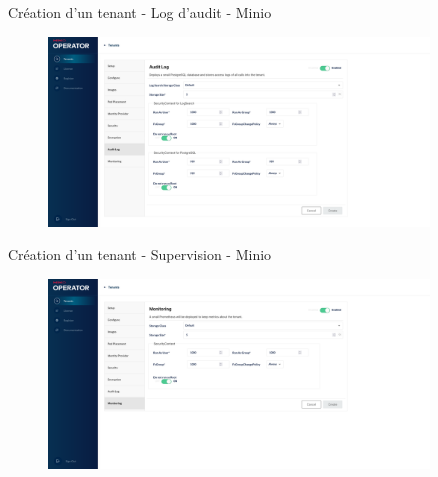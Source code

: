 
\begin{frame}[fragile]{Création d'un tenant - Log d'audit - Minio}

\begin{figure}
\begin{center}
\includegraphics[angle=0, width=0.9\textwidth, height=0.9\textheight]{images/auditlog_minio.eps}
\end{center}
\end{figure}

\end{frame}


\begin{frame}[fragile]{Création d'un tenant - Supervision - Minio}

\begin{figure}
\begin{center}
\includegraphics[angle=0, width=0.9\textwidth, height=0.9\textheight]{images/monitoring_minio.eps}
\end{center}
\end{figure}

\end{frame}

